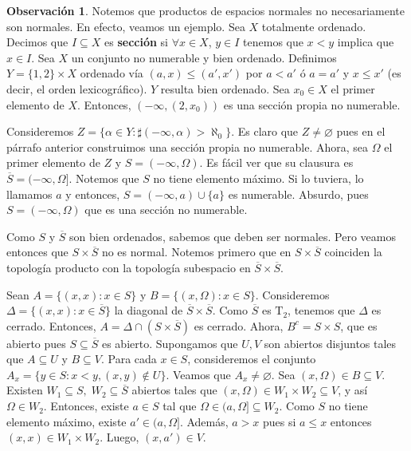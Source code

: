 \documentclass[12pt]{book}
\theoremstyle{definition}
\newtheorem{obs}[teo]{Observación}
\let\emptyset\varnothing
\begin{document}
\begin{obs}
Notemos que productos de espacios normales no necesariamente son normales. En efecto, veamos un ejemplo. Sea $X$ totalmente ordenado. Decimos que $I\subseteq X$ es \textbf{sección} si $\forall x\in X$, $y\in I$ tenemos que $x<y$ implica que $x\in I$. Sea $X$ un conjunto no numerable y bien ordenado. Definimos $Y=\{1,2\}\times  X$ ordenado vía $(a,x)\leq (a',x')$ por $a<a'$ ó $a=a'$ y $x\leq x'$ (es decir, el orden lexicográfico). $Y$ resulta bien ordenado. Sea $x_0\in X$ el primer elemento de $X$. Entonces, $(-\infty, (2,x_0))$ es una sección propia no numerable.

Consideremos $Z=\{\alpha\in Y : \sharp(-\infty, \alpha)>\aleph_0\}$. Es claro que $Z\neq\emptyset$ pues en el párrafo anterior construimos una sección propia no numerable. Ahora, sea $\Omega$ el primer elemento de $Z$ y $S=(-\infty,\Omega)$. Es fácil ver que su clausura es $\overline{S} = (-\infty, \Omega]$. Notemos que $S$ no tiene elemento máximo. Si lo tuviera, lo llamamos $a$ y entonces, $S=(-\infty,a)\cup \{a\}$ es numerable. Absurdo, pues $S=(-\infty,\Omega)$ que es una sección no numerable.

Como $S$ y $\overline{S}$ son bien ordenados, sabemos que deben ser normales. Pero veamos entonces que $S\times\overline{S}$ no es normal. Notemos primero que en $S\times \overline{S}$ coinciden la topología producto con la topología subespacio en $\overline{S}\times\overline{S}$.

Sean $A=\{(x,x) : x\in S\}$ y $B=\{(x,\Omega):x\in S\}$. Consideremos $\Delta = \{(x,x) : x\in\overline{S}\}$ la diagonal de $\overline{S}\times\overline{S}$. Como $\overline{S}$ es $\mathrm{T}_2$, tenemos que $\Delta$ es cerrado. Entonces, $A=\Delta\cap (S\times\overline{S})$ es cerrado. Ahora, $B^c = S\times S$, que es abierto pues $S\subseteq\overline{S}$ es abierto. Supongamos que $U,V$ son abiertos disjuntos tales que $A\subseteq U$ y $B\subseteq V$. Para cada $x\in S$, consideremos el conjunto $A_x = \{y\in S : x<y, (x,y)\notin U\}$. Veamos que $A_x\neq\emptyset$. Sea $(x,\Omega)\in B\subseteq V$. Existen $W_1\subseteq S,\; W_2\subseteq \overline{S}$ abiertos tales que $(x,\Omega)\in W_1\times W_2 \subseteq V$, y así $\Omega\in W_2$. Entonces, existe $a\in S$ tal que $\Omega\in (a,\Omega]\subseteq W_2$. Como $S$ no tiene elemento máximo, existe $a'\in (a,\Omega]$. Además, $a>x$ pues si $a\leq x$ entonces $(x,x)\in W_1\times W_2$. Luego, $(x,a')\in V$.


\end{obs}
\end{document}
